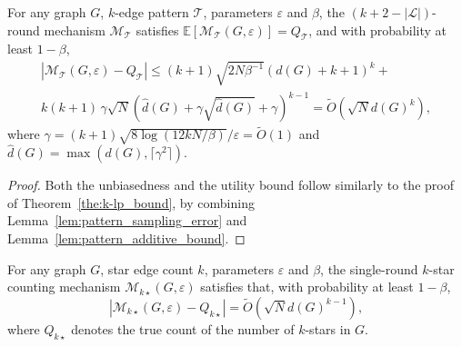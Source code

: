 \begin{theorem}
For any graph $G$, $k$-edge pattern $\mathcal{T}$, parameters $\varepsilon$ and $\beta$,
the $(k + 2 - |\mathcal{L}|)$-round mechanism $\mathcal{M}_\mathcal{T}$ satisfies 
$\mathbb{E}[\mathcal{M}_\mathcal{T}(G, \varepsilon)] = Q_\mathcal{T}$,
and with probability at least $1 - \beta$,
\begin{align*}
    |\mathcal{M}_\mathcal{T}(G, \varepsilon) - Q_\mathcal{T}| 
    \leq
    (k+1) \sqrt{2N\beta^{-1}}(d(G)+k+1)^k +\\
      {k(k+1)} \,
    \gamma
    \sqrt{N}
    (\hat{d}(G) + \gamma \sqrt{\hat{d}(G)} + \gamma)^{k-1} 
    = \tilde{O}(\sqrt{N} d(G)^{k}),
\end{align*}
where $\gamma = (k{+}1)\sqrt{8\log(12kN/\beta)}/\varepsilon = \tilde{O}(1) $ and $\hat{d}(G) = \max(d(G), \lceil \gamma^2 \rceil)$.
\end{theorem}

\begin{proof}

Both the unbiasedness and the utility bound follow similarly to the proof of Theorem~\ref{the:k-lp_bound}, by combining Lemma~\ref{lem:pattern_sampling_error} and Lemma~\ref{lem:pattern_additive_bound}. \qedhere

\end{proof}



\begin{lemma}
 For any graph $G$, star edge count $k$, parameters $\varepsilon$ and $\beta$, the single-round $k$-star counting mechanism $\mathcal{M}_{k\star}(G, \varepsilon)$ satisfies that, with probability at least $1 - \beta$, 
 \begin{equation*}
    |\mathcal{M}_{k\star}(G, \varepsilon) - Q_{k\star }| = \tilde{O}(\sqrt{N}d(G)^{k-1}),
 \end{equation*}
where $Q_{k\star}$ denotes the true count of the number of $k$-stars in $G$.
\end{lemma}


